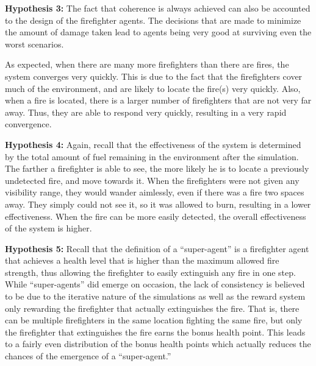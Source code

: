 \documentclass{article}
\begin{document}
\begin{description}
    \item \textbf{Hypothesis 3:}
      The fact that coherence is always achieved can also be accounted to the
      design of the firefighter agents.  The decisions that are made to
      minimize the amount of damage taken lead to agents being very good at
      surviving even the worst scenarios.

      As expected, when there are many more firefighters than there
      are fires, the system converges very quickly.  This is due to the fact
      that the firefighters cover much of the environment, and are likely to
      locate the fire(s) very quickly.  Also, when a fire is located, there
      is a larger number of firefighters that are not very far away. Thus,
      they are able to respond very quickly, resulting in a very rapid convergence.

    \item \textbf{Hypothesis 4:}
      Again, recall that the effectiveness of the system is determined by the
      total amount of fuel remaining in the environment after the simulation.
      The farther a firefighter is able to see, the more likely he is to locate
      a previously undetected fire, and move towards it.  When the firefighters
      were not given any visibility range, they would wander aimlessly, even
      if there was a fire two spaces away.  They simply could not see it, so it
      was allowed to burn, resulting in a lower effectiveness.  When the fire
      can be more easily detected, the overall effectiveness of the system
      is higher.

    \item \textbf{Hypothesis 5:}
      Recall that the definition of a ``super-agent'' is a firefighter agent
      that achieves a health level that is higher than the maximum allowed
      fire strength, thus allowing the firefighter to easily extinguish any
      fire in one step.  While ``super-agents'' did emerge on occasion, the
      lack of consistency is believed to be due to the iterative nature of the
      simulations as well as the reward system only rewarding the firefighter
      that actually extinguishes the fire.  That is, there can be multiple
      firefighters in the same location fighting the same fire, but only the
      firefighter that extinguishes the fire earns the bonus health point.
      This leads to a fairly even distribution of the bonus health points
      which actually reduces the chances of the emergence of a ``super-agent.''

  \end{description}
\end{document}
